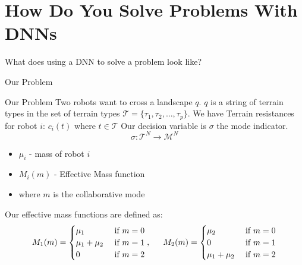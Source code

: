 \documentclass[aspectratio=169, 10pt]{beamer} %
\begin{document}
\section{How Do You Solve Problems With DNNs}
\begin{frame}
    \huge What does using a DNN to solve a problem look like?
\end{frame}

\begin{frame}{Our Problem}
\end{frame}

\begin{frame}{Our Problem}
    Two robots want to cross a landscape $q$. $q$ is a string of terrain types in the set of terrain types $\mathcal{T}= \{ \tau_1,\tau_2, \dots,\tau_p \}$. We have Terrain resistances for robot $i$: $c_i(t)$ where $t \in \mathcal{T}$
  Our decision variable is $\sigma$ the mode indicator.
\begin{equation*}
  \sigma : \mathcal{T} ^N \to \mathcal{ M }^N
\end{equation*}
\begin{itemize}
    \item $\mu_i$ - mass of robot $i$
    \item $M_i(m)$ - Effective Mass function
    \item where $m$ is the collaborative mode
\end{itemize}
Our effective mass functions are defined as:
\begin{equation}
  M_1(m) = \begin{cases}
    \mu_1 & \text{ if } m=0\\
    \mu_1 + \mu_2 & \text{ if } m=1\\
    0 & \text{ if } m=2
  \end{cases}
  , \hspace{15px}
  M_2(m) = \begin{cases}
    \mu_2 & \text{ if } m=0\\
    0 & \text{ if } m=1\\
    \mu_1 + \mu_2  & \text{ if } m=2
  \end{cases}
\end{equation}
  
\end{frame}
\end{document}
